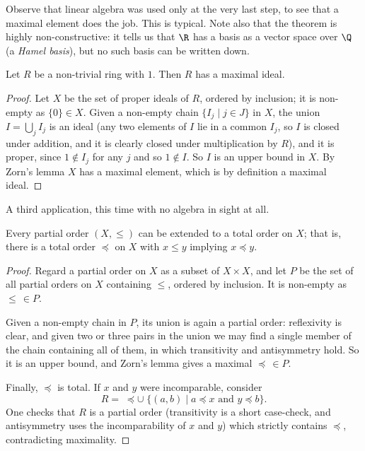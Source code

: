 Observe that linear algebra was used only at the very last step, to see that a maximal element does the job. This is typical. Note also that the theorem is highly non-constructive: it tells us that $\R$ has a basis as a vector space over $\Q$ (a \emph{Hamel basis}), but no such basis can be written down.

\begin{theorem}
  Let $R$ be a non-trivial ring with $1$. Then $R$ has a maximal ideal.
\end{theorem}
\begin{proof}
  Let $X$ be the set of proper ideals of $R$, ordered by inclusion; it is non-empty as $\{0\} \in X$. Given a non-empty chain $\{I_j \mid j \in J\}$ in $X$, the union $I = \bigcup_j I_j$ is an ideal (any two elements of $I$ lie in a common $I_j$, so $I$ is closed under addition, and it is clearly closed under multiplication by $R$), and it is proper, since $1 \notin I_j$ for any $j$ and so $1 \notin I$. So $I$ is an upper bound in $X$. By Zorn's lemma $X$ has a maximal element, which is by definition a maximal ideal.
\end{proof}

A third application, this time with no algebra in sight at all.

\begin{theorem}
  Every partial order $(X, \leq)$ can be extended to a total order on $X$; that is, there is a total order $\preceq$ on $X$ with $x \leq y$ implying $x \preceq y$.
\end{theorem}
\begin{proof}
  Regard a partial order on $X$ as a subset of $X \times X$, and let $P$ be the set of all partial orders on $X$ containing $\leq$, ordered by inclusion. It is non-empty as $\leq \, \in P$.

  Given a non-empty chain in $P$, its union is again a partial order: reflexivity is clear, and given two or three pairs in the union we may find a single member of the chain containing all of them, in which transitivity and antisymmetry hold. So it is an upper bound, and Zorn's lemma gives a maximal $\preceq \, \in P$.

  Finally, $\preceq$ is total. If $x$ and $y$ were incomparable, consider
  $$R = \; \preceq \cup \; \{(a, b) \mid a \preceq x \text{ and } y \preceq b\}.$$
  One checks that $R$ is a partial order (transitivity is a short case-check, and antisymmetry uses the incomparability of $x$ and $y$) which strictly contains $\preceq$, contradicting maximality.
\end{proof}

